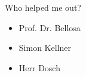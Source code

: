 
Who helped me out?

\begin{itemize}

\item Prof. Dr. Bellosa

\item Simon Kellner

\item Herr Dosch

\end{itemize}
